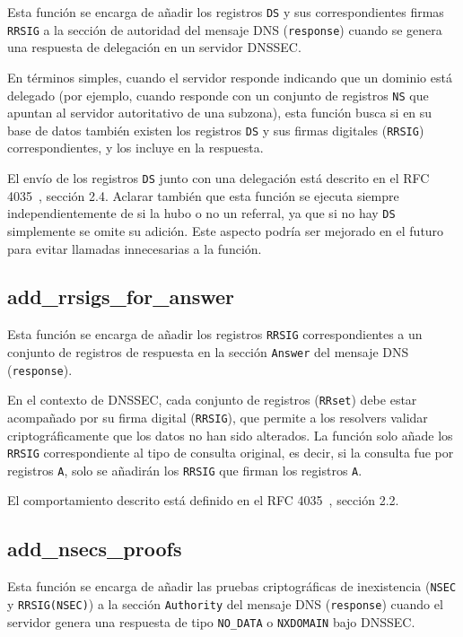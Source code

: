 Esta función se encarga de añadir los registros \texttt{DS} y sus correspondientes firmas \texttt{RRSIG} a la sección de autoridad del mensaje DNS (\texttt{response}) cuando se 
genera una respuesta de delegación en un servidor DNSSEC.

En términos simples, cuando el servidor responde indicando que un dominio está delegado (por ejemplo, cuando responde con un conjunto de registros \texttt{NS} que apuntan al 
servidor autoritativo de una subzona), esta función busca si en su base de datos también existen los registros \texttt{DS} y sus firmas digitales (\texttt{RRSIG}) correspondientes, y 
los incluye en la respuesta.

El envío de los registros \texttt{DS} junto con una delegación está descrito en el RFC 4035~\cite{RFC4035}, sección 2.4. Aclarar también que esta función se ejecuta siempre independientemente 
de si la hubo o no un referral, ya que si no hay \texttt{DS}  simplemente se omite su adición. Este aspecto podría ser mejorado en el futuro para evitar llamadas innecesarias a la función.


\subsection{add\_rrsigs\_for\_answer}

Esta función se encarga de añadir los registros \texttt{RRSIG} correspondientes a un conjunto de registros de respuesta en la sección \texttt{Answer} del mensaje DNS (\texttt{response}).

En el contexto de DNSSEC, cada conjunto de registros (\texttt{RRset}) debe estar acompañado por su firma digital
(\texttt{RRSIG}), que permite a los resolvers validar criptográficamente que los datos no han sido alterados. La función solo añade los \texttt{RRSIG} correspondiente al tipo de consulta original, 
es decir, si la consulta fue por registros \texttt{A}, solo se añadirán los \texttt{RRSIG} que firman los registros \texttt{A}. 

El comportamiento descrito está definido en el RFC 4035~\cite{RFC4035}, sección 2.2.

\subsection{add\_nsecs\_proofs}

Esta función se encarga de añadir las pruebas criptográficas de inexistencia (\texttt{NSEC} y \texttt{RRSIG(NSEC)})
a la sección \texttt{Authority} del mensaje DNS (\texttt{response}) cuando el servidor genera una respuesta
de tipo \texttt{NO\_DATA} o \texttt{NXDOMAIN} bajo DNSSEC.

